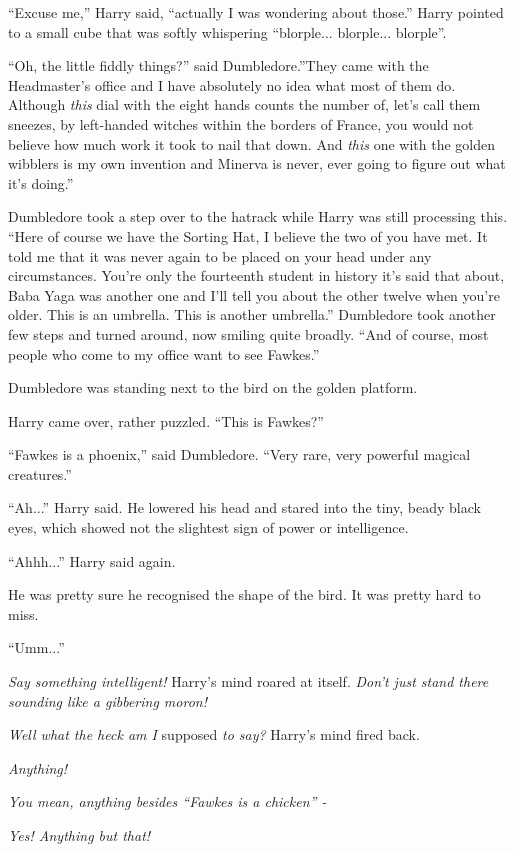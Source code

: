 ``Excuse me,'' Harry said, ``actually I was wondering about those.''
Harry pointed to a small cube that was softly whispering
``blorple... blorple... blorple''.

``Oh, the little fiddly things?'' said Dumbledore.''They came with the
Headmaster's office and I have absolutely no idea what most of them do.
Although \emph{this} dial with the eight hands counts the number of,
let's call them sneezes, by left-handed witches within the borders of
France, you would not believe how much work it took to nail that down.
And \emph{this} one with the golden wibblers is my own invention and
Minerva is never, ever going to figure out what it's doing.''

Dumbledore took a step over to the hatrack while Harry was still
processing this. ``Here of course we have the Sorting Hat, I believe the
two of you have met. It told me that it was never again to be placed on
your head under any circumstances. You're only the fourteenth student in
history it's said that about, Baba Yaga was another one and I'll tell
you about the other twelve when you're older. This is an umbrella. This
is another umbrella.'' Dumbledore took another few steps and turned
around, now smiling quite broadly. ``And of course, most people who come
to my office want to see Fawkes.''

Dumbledore was standing next to the bird on the golden platform.

Harry came over, rather puzzled. ``This is Fawkes?''

``Fawkes is a phoenix,'' said Dumbledore. ``Very rare, very powerful
magical creatures.''

``Ah...'' Harry said. He lowered his head and stared into the tiny,
beady black eyes, which showed not the slightest sign of power or
intelligence.

``Ahhh...'' Harry said again.

He was pretty sure he recognised the shape of the bird. It was pretty
hard to miss.

``Umm...''

\emph{Say something intelligent!} Harry's mind roared at itself.
\emph{Don't just stand there sounding like a gibbering moron!}

\emph{Well what the heck am I} supposed \emph{to say?} Harry's mind
fired back.

\emph{Anything!}

\emph{You mean, anything besides ``Fawkes is a chicken'' -}

\emph{Yes! Anything but that!}

